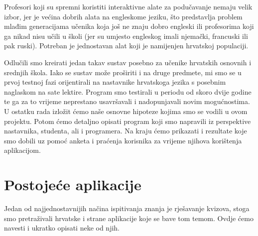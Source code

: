 \documentclass[11pt]{scrreprt}
\begin{document}
Profesori koji su spremni koristiti interaktivne alate za podučavanje nemaju velik
izbor, jer je većina dobrih alata na engleskome jeziku, što predstavlja problem
mlađim generacijama učenika koja još ne znaju dobro engleski ili profesorima
koji ga nikad nisu učili u školi (jer su umjesto engleskog imali njemački,
francuski ili pak ruski). Potreban je jednostavan alat koji je namijenjen
hrvatskoj populaciji.

Odlučili smo kreirati jedan takav sustav posebno za učenike hrvatskih osnovnih
i srednjih škola. Iako se sustav može proširiti i na druge predmete, mi smo se
u prvoj testnoj fazi orijentirali na nastavnike hrvatskoga jezika s posebnim
naglaskom na sate lektire. Program smo testirali u periodu od skoro dvije
godine te ga za to vrijeme neprestano usavršavali i nadopunjavali novim
mogućnostima. U ostatku rada izložit ćemo naše osnovne hipoteze kojima smo se
vodili u ovom projektu. Potom ćemo detaljno opisati program koji smo napravili
iz perspektive nastavnika, studenta, ali i programera. Na kraju ćemo prikazati
i rezultate koje smo dobili uz pomoć anketa i praćenja korisnika za vrijeme
njihova korištenja aplikacijom.

\section*{Postojeće aplikacije}

Jedan od najjednostavnijih načina ispitivanja znanja je rješavanje kvizova,
stoga smo pretraživali hrvatske i strane aplikacije koje se bave tom temom.
Ovdje ćemo navesti i ukratko opisati neke od njih.
\end{document}
